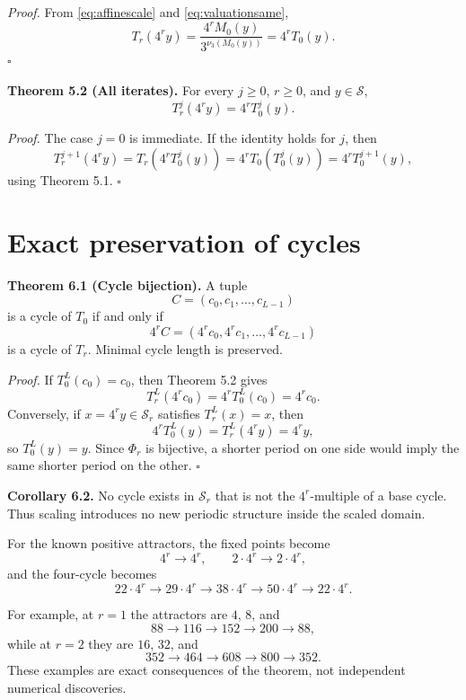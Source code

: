 \documentclass[11pt]{article}
\newcommand{\vthree}{\nu_3}
\newcommand{\Sbase}{\mathcal S}
\newcommand{\Sr}{\mathcal S_r}
\begin{document}
\textit{Proof.} From \eqref{eq:affinescale} and \eqref{eq:valuationsame},
\[
T_r(4^r y)
=\frac{4^rM_0(y)}{3^{\vthree(M_0(y))}}
=4^rT_0(y).
\]
\hfill$\square$

\textbf{Theorem 5.2 (All iterates).} For every $j\ge0$, $r\ge0$, and $y\in\Sbase$,
\begin{equation}
\boxed{T_r^j(4^r y)=4^rT_0^j(y).}
\label{eq:iterates}
\end{equation}

\textit{Proof.} The case $j=0$ is immediate. If the identity holds for $j$, then
\[
T_r^{j+1}(4^r y)
=T_r(4^rT_0^j(y))
=4^rT_0(T_0^j(y))
=4^rT_0^{j+1}(y),
\]
using Theorem 5.1. \hfill$\square$

\section{Exact preservation of cycles}
\textbf{Theorem 6.1 (Cycle bijection).} A tuple
\[
C=(c_0,c_1,\ldots,c_{L-1})
\]
is a cycle of $T_0$ if and only if
\[
4^rC=(4^rc_0,4^rc_1,\ldots,4^rc_{L-1})
\]
is a cycle of $T_r$. Minimal cycle length is preserved.

\textit{Proof.} If $T_0^L(c_0)=c_0$, then Theorem 5.2 gives
\[
T_r^L(4^rc_0)=4^rT_0^L(c_0)=4^rc_0.
\]
Conversely, if $x=4^ry\in\Sr$ satisfies $T_r^L(x)=x$, then
\[
4^rT_0^L(y)=T_r^L(4^ry)=4^ry,
\]
so $T_0^L(y)=y$. Since $\Phi_r$ is bijective, a shorter period on one side would imply the same shorter period on the other. \hfill$\square$

\textbf{Corollary 6.2.} No cycle exists in $\Sr$ that is not the $4^r$-multiple of a base cycle. Thus scaling introduces no new periodic structure inside the scaled domain.

For the known positive attractors, the fixed points become
\begin{equation}
4^r\longrightarrow4^r,
\qquad
2\cdot4^r\longrightarrow2\cdot4^r,
\end{equation}
and the four-cycle becomes
\begin{equation}
22\cdot4^r\to29\cdot4^r\to38\cdot4^r\to50\cdot4^r\to22\cdot4^r.
\label{eq:scaledcycle}
\end{equation}

For example, at $r=1$ the attractors are $4$, $8$, and
\[
88\to116\to152\to200\to88,
\]
while at $r=2$ they are $16$, $32$, and
\[
352\to464\to608\to800\to352.
\]
These examples are exact consequences of the theorem, not independent numerical discoveries.
\end{document}

